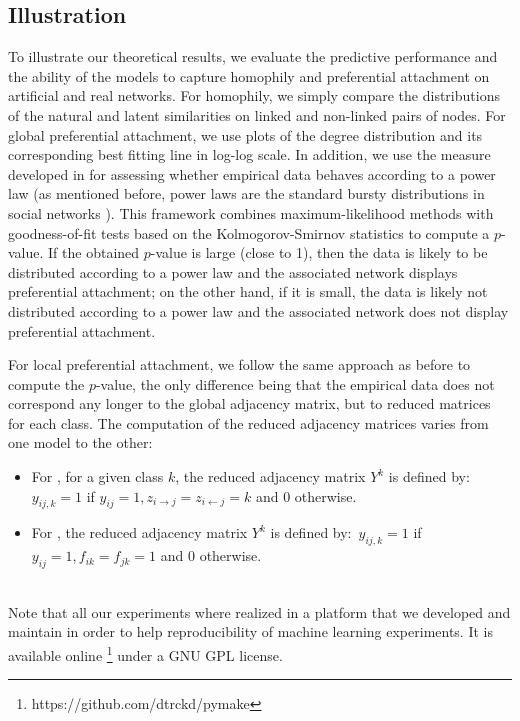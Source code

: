 
\subsection{Illustration}
\label{sec:exps}

To illustrate our theoretical results, we evaluate the predictive performance and the ability of the models to capture homophily and preferential attachment on artificial and real networks. For homophily, we simply compare the distributions of the natural and latent similarities on linked and non-linked pairs of nodes. For global preferential attachment, we use plots of the degree distribution and its corresponding best fitting line in log-log scale. In addition, we use the measure developed in \cite{clauset2009power} for assessing whether empirical data behaves according to a power law (as mentioned before, power laws are the standard bursty distributions in social networks \cite{barabasi1999emergence}). This framework combines maximum-likelihood methods with goodness-of-fit tests based on the Kolmogorov-Smirnov statistics to compute a $p$-value. If the obtained $p$-value is large (close to 1), then the data is likely to be distributed according to a power law and the associated network displays preferential attachment;  on the other hand, if it is small, the data is likely not distributed according to a power law and the associated network does not display preferential attachment.

For local preferential attachment, we follow the same approach as before to compute the $p$-value, the only difference being that the empirical data does not correspond any longer to the global adjacency matrix, but to reduced matrices for each class. The computation of the reduced adjacency matrices varies from one model to the other:
%
\begin{itemize}
    \item For \imb, for a given class $k$, the reduced adjacency matrix $Y^k$ is defined by:~$y_{ij,k}=1$ if $y_{ij}=1, z_{i\rightarrow j}=z_{i\leftarrow j}=k$ and $0$ otherwise.
    \item For \ifm, the reduced adjacency matrix $Y^k$ is defined by:~$ y_{ij,k}=1$ if $y_{ij}=1 , f_{ik}=f_{jk}=1$ and $0$ otherwise.
\end{itemize}~\\


Note that all our experiments where realized in a platform that we developed and maintain in order to help reproducibility of machine learning experiments. It is available online \footnote{https://github.com/dtrckd/pymake} under a GNU GPL license.

